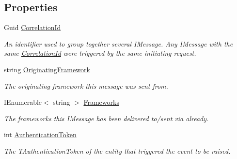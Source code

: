 \subsection*{Properties}
\begin{DoxyCompactItemize}
\item 
Guid \hyperlink{classCqrs_1_1Tests_1_1Integrations_1_1SnapshotTests_1_1RandomNumberEvent_ade7e271abb9f183a64db424f58703358_ade7e271abb9f183a64db424f58703358}{Correlation\+Id}
\begin{DoxyCompactList}\small\item\em An identifier used to group together several I\+Message. Any I\+Message with the same \hyperlink{classCqrs_1_1Tests_1_1Integrations_1_1SnapshotTests_1_1RandomNumberEvent_ade7e271abb9f183a64db424f58703358_ade7e271abb9f183a64db424f58703358}{Correlation\+Id} were triggered by the same initiating request. \end{DoxyCompactList}\item 
string \hyperlink{classCqrs_1_1Tests_1_1Integrations_1_1SnapshotTests_1_1RandomNumberEvent_a815274c67b120e965d31b021a5fde7be_a815274c67b120e965d31b021a5fde7be}{Originating\+Framework}
\begin{DoxyCompactList}\small\item\em The originating framework this message was sent from. \end{DoxyCompactList}\item 
I\+Enumerable$<$ string $>$ \hyperlink{classCqrs_1_1Tests_1_1Integrations_1_1SnapshotTests_1_1RandomNumberEvent_a2478f29b5d1ffc5a40c61ca9699931af_a2478f29b5d1ffc5a40c61ca9699931af}{Frameworks}
\begin{DoxyCompactList}\small\item\em The frameworks this I\+Message has been delivered to/sent via already. \end{DoxyCompactList}\item 
int \hyperlink{classCqrs_1_1Tests_1_1Integrations_1_1SnapshotTests_1_1RandomNumberEvent_a84d0dbf557023ba54ba6ebce48794e20_a84d0dbf557023ba54ba6ebce48794e20}{Authentication\+Token}
\begin{DoxyCompactList}\small\item\em The {\itshape T\+Authentication\+Token}  of the entity that triggered the event to be raised. \end{DoxyCompactList}\item 

\end{DoxyCompactItemize}
